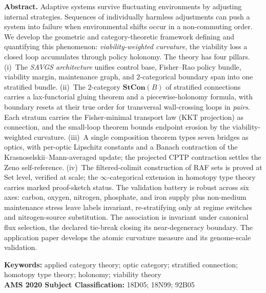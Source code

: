 \documentclass[11pt,a4paper]{article}
\theoremstyle{plain}
\theoremstyle{definition}
\theoremstyle{remark}
\begin{document}
\vspace{0.6em}
\begin{center}
\begin{minipage}{0.92\textwidth}
\small
\textbf{Abstract.} Adaptive systems survive fluctuating
environments by adjusting internal strategies. Sequences of
individually harmless adjustments can push a system into failure
when environmental shifts occur in a non-commuting order. We
develop the geometric and category-theoretic framework defining
and quantifying this phenomenon: \emph{viability-weighted
curvature}, the viability loss a closed loop accumulates
through policy holonomy. The theory has four pillars.
(i)~The \emph{SAVGS architecture} unifies control base, Fisher--Rao
policy bundle, viability margin, maintenance graph, and
$2$-categorical boundary span into one stratified bundle.
(ii)~The $2$-category $\mathbf{StCon}(B)$ of stratified connections
carries a lax-functorial gluing theorem and a piecewise-holonomy
formula, with boundary resets at their true order for transversal
wall-crossing loops in \emph{pairs}. Each stratum carries the
Fisher-minimal transport law (KKT projection) as connection, and
the small-loop theorem bounds endpoint erosion by the
viability-weighted curvature.
(iii)~A single composition theorem types seven bridges as optics,
with per-optic Lipschitz constants and a Banach contraction of the
Krasnoselskii--Mann-averaged update; the projected CPTP contraction
settles the Zeno self-reference.
(iv)~The filtered-colimit construction of RAF sets is proved at Set
level, verified at scale; the $\infty$-categorical extension in
homotopy type theory carries marked proof-sketch status. The
validation battery is
robust across six axes: carbon, oxygen, nitrogen, phosphate, and iron
supply plus non-medium maintenance stress leave labels invariant,
re-stratifying only at regime switches and
nitrogen-source substitution. The association is
invariant under canonical flux selection, the declared tie-break
closing its near-degeneracy boundary. The application paper
develops the atomic curvature measure and its genome-scale
validation.\par
\vspace{0.5em}

\noindent\textbf{Keywords:} applied category theory; optic
category; stratified connection; homotopy type theory; holonomy;
viability theory\\[0.3em]
\noindent\textbf{AMS 2020 Subject Classification:} 18D05; 18N99;
92B05\par
\end{minipage}
\end{center}
\end{document}
